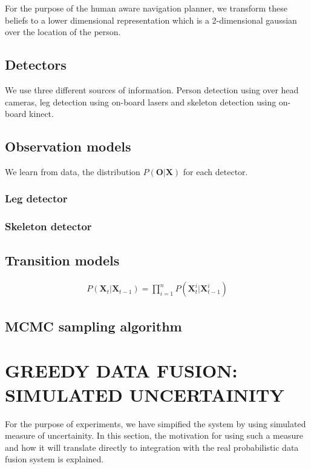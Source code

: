 For the purpose of the human aware navigation planner, we transform these beliefs to a lower dimensional representation which is a 2-dimensional gaussian over the location of the person.

\subsection{Detectors}
We use three different sources of information. Person detection using over head cameras, leg detection using on-board lasers and skeleton detection using on-board kinect. 

\subsection{Observation models}
We learn from data, the distribution $P(\textbf{O}|\textbf{X})$ for each detector. 
\subsubsection{Leg detector}

\subsubsection{Skeleton detector}

\subsection{Transition models}

\begin{align}
P(\textbf{X}_{t}|\textbf{X}_{t-1}) = \prod_{i=1}^{n} P(\textbf{X}^{i}_{t}|\textbf{X}^{i}_{t-1})
\end{align}
\subsection{MCMC sampling algorithm}


\section{GREEDY DATA FUSION: SIMULATED UNCERTAINITY}
For the purpose of experiments, we have simpified the system by using simulated measure of uncertainity. In this section, the motivation for using such a measure and how it will translate directly to integration with the real probabilistic data fusion system is explained.

